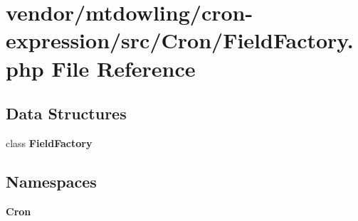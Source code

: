 \section{vendor/mtdowling/cron-\/expression/src/\+Cron/\+Field\+Factory.php File Reference}
\label{_field_factory_8php}
\subsection*{Data Structures}
\begin{DoxyCompactItemize}
\item 
class {\bf Field\+Factory}
\end{DoxyCompactItemize}
\subsection*{Namespaces}
\begin{DoxyCompactItemize}
\item 
 {\bf Cron}
\end{DoxyCompactItemize}
